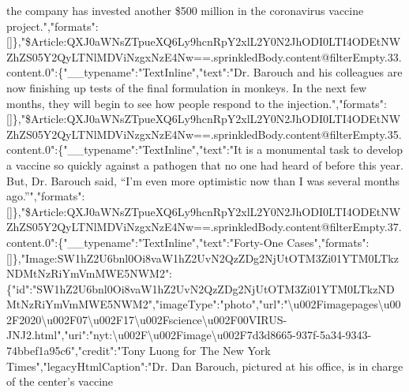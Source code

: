 the company has invested another \$500 million in the coronavirus
vaccine
project.","formats":{[}{]}\},"\$Article:QXJ0aWNsZTpueXQ6Ly9hcnRpY2xlL2Y0N2JhODI0LTI4ODEtNWZhZS05Y2QyLTNlMDViNzgxNzE4Nw==.sprinkledBody.content@filterEmpty.33.content.0":\{"\_\_typename":"TextInline","text":"Dr.
Barouch and his colleagues are now finishing up tests of the final
formulation in monkeys. In the next few months, they will begin to see
how people respond to the
injection.","formats":{[}{]}\},"\$Article:QXJ0aWNsZTpueXQ6Ly9hcnRpY2xlL2Y0N2JhODI0LTI4ODEtNWZhZS05Y2QyLTNlMDViNzgxNzE4Nw==.sprinkledBody.content@filterEmpty.35.content.0":\{"\_\_typename":"TextInline","text":"It
is a monumental task to develop a vaccine so quickly against a pathogen
that no one had heard of before this year. But, Dr. Barouch said, ``I'm
even more optimistic now than I was several months
ago.''","formats":{[}{]}\},"\$Article:QXJ0aWNsZTpueXQ6Ly9hcnRpY2xlL2Y0N2JhODI0LTI4ODEtNWZhZS05Y2QyLTNlMDViNzgxNzE4Nw==.sprinkledBody.content@filterEmpty.37.content.0":\{"\_\_typename":"TextInline","text":"Forty-One
Cases","formats":{[}{]}\},"Image:SW1hZ2U6bnl0Oi8vaW1hZ2UvN2QzZDg2NjUtOTM3Zi01YTM0LTkzNDMtNzRiYmVmMWE5NWM2":\{"id":"SW1hZ2U6bnl0Oi8vaW1hZ2UvN2QzZDg2NjUtOTM3Zi01YTM0LTkzNDMtNzRiYmVmMWE5NWM2","imageType":"photo","url":"\textbackslash{}u002Fimagepages\textbackslash{}u002F2020\textbackslash{}u002F07\textbackslash{}u002F17\textbackslash{}u002Fscience\textbackslash{}u002F00VIRUS-JNJ2.html","uri":"nyt:\textbackslash{}u002F\textbackslash{}u002Fimage\textbackslash{}u002F7d3d8665-937f-5a34-9343-74bbef1a95c6","credit":"Tony
Luong for The New York Times","legacyHtmlCaption":"Dr. Dan Barouch,
pictured at his office, is in charge of the center's vaccine
